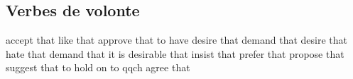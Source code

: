 \subsection*{Verbes de volonte}
   {accept that}
   {like that}
   {approve that}
   {to have desire that}
   {demand that}
   {desire that}
   {hate that}
   {demand that}
   {it is desirable that}
   {insist that}
   {prefer that}
   {propose that}
   {suggest that}
   {to hold on to qqch}
   {agree that}
